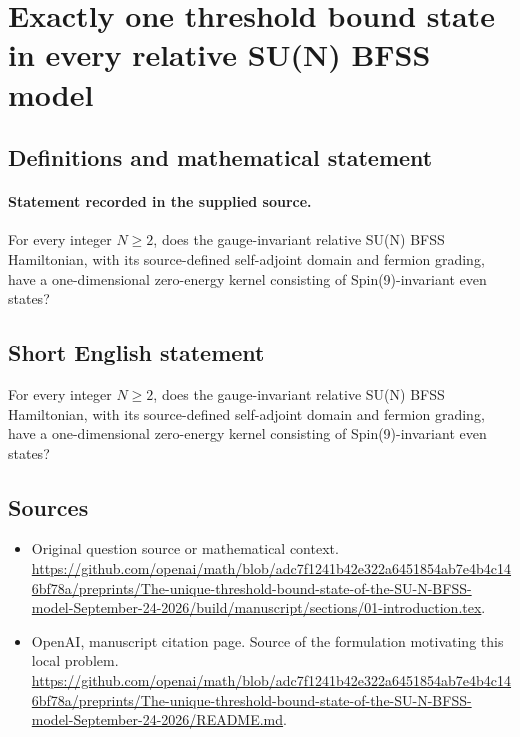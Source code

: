 \documentclass[11pt]{article}
\begin{document}
\section*{Exactly one threshold bound state in every relative SU(N) BFSS model}\label{statement}
\subsection{Definitions and mathematical statement}
\paragraph{Statement recorded in the supplied source.}
For every integer $N\geq 2$, does the gauge-invariant relative SU(N) BFSS Hamiltonian, with its source-defined self-adjoint domain and fermion grading, have a one-dimensional zero-energy kernel consisting of Spin(9)-invariant even states?
\subsection{Short English statement}
For every integer $N\geq 2$, does the gauge-invariant relative SU(N) BFSS Hamiltonian, with its source-defined self-adjoint domain and fermion grading, have a one-dimensional zero-energy kernel consisting of Spin(9)-invariant even states?
\subsection{Sources}
\begin{itemize}
\item[S1] Original question source or mathematical context.
\url{https://github.com/openai/math/blob/adc7f1241b42e322a6451854ab7e4b4c146bf78a/preprints/The-unique-threshold-bound-state-of-the-SU-N-BFSS-model-September-24-2026/build/manuscript/sections/01-introduction.tex}.
\item[S2] OpenAI, manuscript citation page. Source of the formulation motivating this local problem.
\url{https://github.com/openai/math/blob/adc7f1241b42e322a6451854ab7e4b4c146bf78a/preprints/The-unique-threshold-bound-state-of-the-SU-N-BFSS-model-September-24-2026/README.md}.
\end{itemize}
\end{document}
